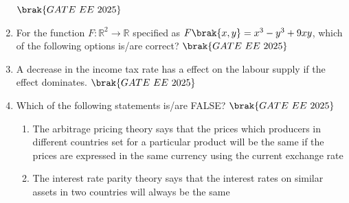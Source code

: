 \documentclass[journal,12pt,onecolumn]{IEEEtran}
\theoremstyle{remark}
\begin{document}
\begin{enumerate}
\hfill $\brak{GATE\ EE\ 2025}$
\begin{enumerate}
\end{enumerate}
\item For the function $F: \mathbb{R}^2 \to \mathbb{R}$ specified as $F\brak{x, y} = x^3 - y^3 + 9xy$, which of the following options is/are correct?
\hfill $\brak{GATE\ EE\ 2025}$
\begin{enumerate}
\end{enumerate}
\item A decrease in the income tax rate has a \underline{\hspace{1cm}} effect on the labour supply if the \underline{\hspace{1cm}} effect dominates.
\hfill $\brak{GATE\ EE\ 2025}$
\begin{enumerate}
\end{enumerate}
\item Which of the following statements is/are FALSE?
\hfill $\brak{GATE\ EE\ 2025}$
\begin{enumerate}
\item The arbitrage pricing theory says that the prices which producers in different countries set for a particular product will be the same if the prices are expressed in the same currency using the current exchange rate
\item The interest rate parity theory says that the interest rates on similar assets in two countries will always be the same

\end{enumerate}
\end{enumerate}
\end{document}
